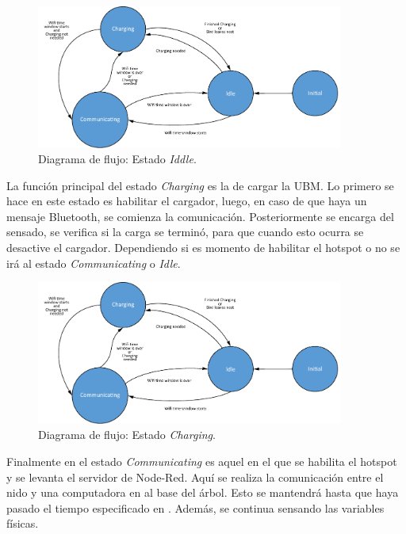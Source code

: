 \begin{figure}[H]
	\centering
	\includegraphics[width=0.9\textwidth, page=4]{ImagenesIngenieria de Detalle/FlowChart.pdf}	
	\caption{Diagrama de flujo: Estado \textit{Iddle}.}
	\label{fig:Diagrama_de_flujo_idle}
\end{figure}

La función principal del estado \textit{Charging} es la de cargar la UBM. Lo primero se hace en este estado es habilitar el cargador, luego, en caso de que haya un mensaje Bluetooth, se comienza la comunicación. Posteriormente se encarga del sensado, se verifica si la carga se terminó, para que cuando esto ocurra se desactive el cargador. Dependiendo si es momento de habilitar el hotspot o no se irá al estado \textit{Communicating} o \textit{Idle}.

\begin{figure}[H]
	\centering
	\includegraphics[width=0.9\textwidth, page=2]{ImagenesIngenieria de Detalle/FlowChart.pdf}
	\caption{Diagrama de flujo: Estado \textit{Charging}.}
	\label{fig:Diagrama_de_flujo_charging}
\end{figure}

Finalmente en el estado \textit{Communicating} es aquel en el que se habilita el hotspot y se levanta el servidor de Node-Red. Aquí se realiza la comunicación entre el nido y una computadora en al base del árbol. Esto se mantendrá hasta que haya pasado el tiempo especificado en . Además, se continua sensando las variables físicas.

